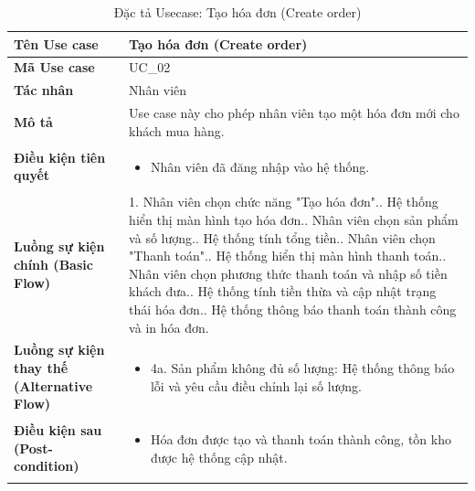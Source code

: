 \documentclass[12pt,a4paper]{report}
\begin{document}
\vspace{0.5cm}

\begin{longtable}{|>{\raggedright\arraybackslash\bfseries}p{4.5cm}|p{11cm}|}
\caption{Đặc tả Usecase: Tạo hóa đơn (Create order)} \label{tab:uc_create_order} \\
\hline
Tên Use case & Tạo hóa đơn (Create order) \\ \hline
Mã Use case & UC\_02 \\ \hline
Tác nhân & Nhân viên \\ \hline
Mô tả & Use case này cho phép nhân viên tạo một hóa đơn mới cho khách mua hàng. \\ \hline
Điều kiện tiên quyết & 
\begin{itemize}[leftmargin=*, nosep, topsep=0pt, partopsep=0pt]
    \item Nhân viên đã đăng nhập vào hệ thống.
\end{itemize} \\ \hline
Luồng sự kiện chính (Basic Flow) & 
1. Nhân viên chọn chức năng "Tạo hóa đơn".\newline
2. Hệ thống hiển thị màn hình tạo hóa đơn.\newline
3. Nhân viên chọn sản phẩm và số lượng.\newline
4. Hệ thống tính tổng tiền.\newline
5. Nhân viên chọn "Thanh toán".\newline
6. Hệ thống hiển thị màn hình thanh toán.\newline
7. Nhân viên chọn phương thức thanh toán và nhập số tiền khách đưa.\newline
8. Hệ thống tính tiền thừa và cập nhật trạng thái hóa đơn.\newline
9. Hệ thống thông báo thanh toán thành công và in hóa đơn. \\ \hline
Luồng sự kiện thay thế (Alternative Flow) & 
\begin{itemize}[leftmargin=*, nosep, topsep=0pt, partopsep=0pt]
    \item 4a. Sản phẩm không đủ số lượng: Hệ thống thông báo lỗi và yêu cầu điều chỉnh lại số lượng.
\end{itemize} \\ \hline
Điều kiện sau (Post-condition) & 
\begin{itemize}[leftmargin=*, nosep, topsep=0pt, partopsep=0pt]
    \item Hóa đơn được tạo và thanh toán thành công, tồn kho được hệ thống cập nhật.
\end{itemize} \\ \hline
\end{longtable}
\end{document}
